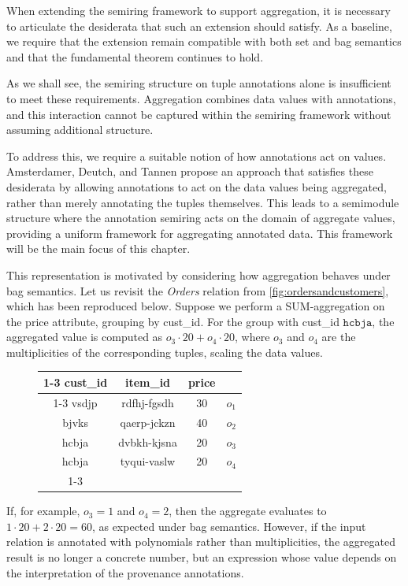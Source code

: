 \documentclass[oneside, 11pt]{amsbook}
\theoremstyle{plain}
\theoremstyle{definition}
\theoremstyle{remark}
\begin{document}
When extending the semiring framework to support aggregation, it is necessary to articulate the desiderata that such an extension should satisfy. As a baseline, we require that the extension remain compatible with both set and bag semantics and that the fundamental theorem continues to hold.

As we shall see, the semiring structure on tuple annotations alone is insufficient to meet these requirements. Aggregation combines data values with annotations, and this interaction cannot be captured within the semiring framework without assuming additional structure.

To address this, we require a suitable notion of how annotations act on values. Amsterdamer, Deutch, and Tannen \cite{Amsterdamer2011b} propose an approach that satisfies these desiderata by allowing annotations to act on the data values being aggregated, rather than merely annotating the tuples themselves. This leads to a semimodule structure where the annotation semiring acts on the domain of aggregate values, providing a uniform framework for aggregating annotated data. This framework will be the main focus of this chapter.

This representation is motivated by considering how aggregation behaves under bag semantics. Let us revisit the \textit{Orders} relation from \autoref{fig:ordersandcustomers}, which has been reproduced below. Suppose we perform a SUM-aggregation on the price attribute, grouping by cust\_id. For the group with cust\_id $\texttt{hcbja}$, the aggregated value is computed as $o_3 \cdot 20 + o_4 \cdot 20$, where $o_3$ and $o_4$ are the multiplicities of the corresponding tuples, scaling the data values.

\begin{figure}[htbp]
    \centering
    \begin{tabular}{|c|c|c|c}
        \cline{1-3}
        cust\_id & item\_id    & price &       \\ \cline{1-3}
        vsdjp    & rdfhj-fgsdh & 30    & $o_1$ \\
        bjvks    & qaerp-jckzn & 40    & $o_2$ \\
        hcbja    & dvbkh-kjsna & 20    & $o_3$ \\
        hcbja    & tyqui-vaslw & 20    & $o_4$ \\ \cline{1-3}
    \end{tabular}
\end{figure}

If, for example, $o_3 = 1$ and $o_4 = 2$, then the aggregate evaluates to $1 \cdot 20 + 2 \cdot 20 = 60$, as expected under bag semantics. However, if the input relation is annotated with polynomials rather than multiplicities, the aggregated result is no longer a concrete number, but an expression whose value depends on the interpretation of the provenance annotations.
\end{document}
